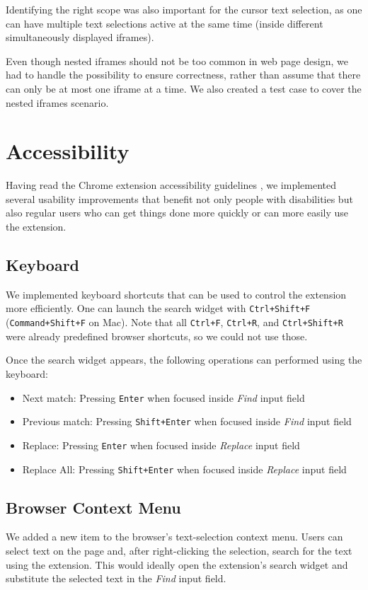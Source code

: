 \documentclass[bsc,frontabs,twoside,singlespacing,parskip,deptreport]{infthesis}
\providecommand{\tightlist}{%
  \setlength{\itemsep}{0pt}\setlength{\parskip}{0pt}}
\begin{document}
Identifying the right scope was also important for the cursor text selection, as one can have multiple text selections active at the same time (inside different simultaneously displayed iframes).

Even though nested iframes should not be too common in web page design, we had to handle the possibility to ensure correctness, rather than assume that there can only be at most one iframe at a time. We also created a test case to cover the nested iframes scenario.

\section{Accessibility}
Having read the Chrome extension accessibility guidelines \cite{C4}, we implemented several usability improvements that benefit not only people with disabilities but also regular users who can get things done more quickly or can more easily use the extension. 

\subsection{Keyboard}
We implemented keyboard shortcuts that can be used to control the extension more efficiently. One can launch the search widget with \texttt{Ctrl+Shift+F} (\texttt{Command+Shift+F} on
Mac). Note that all \texttt{Ctrl+F}, \texttt{Ctrl+R}, and
\texttt{Ctrl+Shift+R} were already predefined browser shortcuts, so we could not use those.

Once the search widget appears, the following operations can performed using the keyboard:
\begin{itemize}
\tightlist
\item
  Next match: Pressing \texttt{Enter} when focused inside \emph{Find} input field
\item
  Previous match: Pressing \texttt{Shift+Enter} when focused inside \emph{Find} input field
\item
  Replace: Pressing \texttt{Enter} when focused inside \emph{Replace} input field
\item
  Replace All: Pressing \texttt{Shift+Enter} when focused inside \emph{Replace} input field
\end{itemize}

\subsection{Browser Context Menu}
We added a new item to the browser's text-selection context menu. Users can select text on the page and, after right-clicking the selection, search for the text using the extension. This would ideally open the extension's search widget and substitute the selected text in the \textit{Find} input field. 
\end{document}
